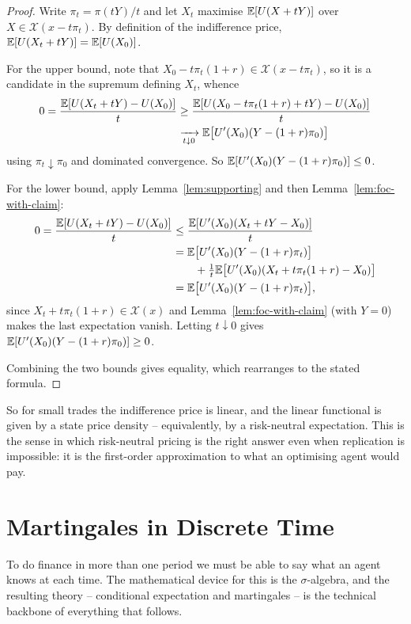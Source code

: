 \documentclass[a4paper]{scrartcl}
\begin{document}
\begin{proof}
	Write $\pi_t = \pi(tY)/t$ and let $X_t$ maximise $\mathbb{E}[U(X + tY)]$ over $X \in \mathcal{X}(x - t\pi_t)$. By definition of the indifference price, $\mathbb{E}[U(X_t + tY)] = \mathbb{E}[U(X_0)]$.

	For the upper bound, note that $X_0 - t\pi_t(1+r) \in \mathcal{X}(x - t\pi_t)$, so it is a candidate in the supremum defining $X_t$, whence
	\begin{align*}
		0 = \frac{\mathbb{E}[U(X_t+tY) - U(X_0)]}{t} &\geq \frac{\mathbb{E}[U(X_0 - t\pi_t(1+r)+tY) - U(X_0)]}{t}\\
		&\xrightarrow[t\downarrow 0]{} \mathbb{E}\big[U'(X_0)(Y - (1+r)\pi_0)\big]
	\end{align*}
	using $\pi_t \downarrow \pi_0$ and dominated convergence. So $\mathbb{E}[U'(X_0)(Y - (1+r)\pi_0)] \leq 0$.

	For the lower bound, apply Lemma~\ref{lem:supporting} and then Lemma~\ref{lem:foc-with-claim}:
	\begin{align*}
		0 = \frac{\mathbb{E}[U(X_t+tY)-U(X_0)]}{t} &\leq \frac{\mathbb{E}[U'(X_0)(X_t + tY - X_0)]}{t}\\
		&= \mathbb{E}\big[U'(X_0)(Y - (1+r)\pi_t)\big]\\
		&\qquad{}+ \tfrac{1}{t}\mathbb{E}\big[U'(X_0)(X_t + t\pi_t(1+r) - X_0)\big]\\
		&= \mathbb{E}\big[U'(X_0)(Y - (1+r)\pi_t)\big],
	\end{align*}
	since $X_t + t\pi_t(1+r) \in \mathcal{X}(x)$ and Lemma~\ref{lem:foc-with-claim} (with $Y=0$) makes the last expectation vanish. Letting $t \downarrow 0$ gives $\mathbb{E}[U'(X_0)(Y-(1+r)\pi_0)] \geq 0$.

	Combining the two bounds gives equality, which rearranges to the stated formula.
\end{proof}

So for small trades the indifference price is linear, and the linear functional is given by a state price density -- equivalently, by a risk-neutral expectation. This is the sense in which risk-neutral pricing is the right answer even when replication is impossible: it is the first-order approximation to what an optimising agent would pay.

\section{Martingales in Discrete Time}

To do finance in more than one period we must be able to say what an agent knows at each time. The mathematical device for this is the $\sigma$-algebra, and the resulting theory -- conditional expectation and martingales -- is the technical backbone of everything that follows.
\end{document}
